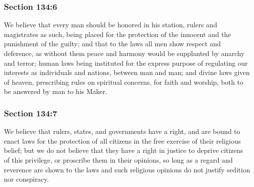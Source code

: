 
	\subsubsection{Section 134:6} %
		\label{DC134-6}

		We believe that every man should be honored in his station, rulers and magistrates as such, being placed for the protection of the innocent and the punishment of the guilty; and that to the laws all men show respect and deference, as without them peace and harmony would be supplanted by anarchy and terror; human laws being instituted for the express purpose of regulating our interests as individuals and nations, between man and man; and divine laws given of heaven, prescribing rules on spiritual concerns, for faith and worship, both to be answered by man to his Maker.


	\subsubsection{Section 134:7} %
		\label{DC134-7}

		We believe that rulers, states, and governments have a right, and are bound to enact laws for the protection of all citizens in the free exercise of their religious belief; but we do not believe that they have a right in justice to deprive citizens of this privilege, or proscribe them in their opinions, so long as a regard and reverence are shown to the laws and such religious opinions do not justify sedition nor conspiracy.


